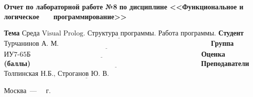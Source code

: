 \documentclass[12pt]{report}
\begin{document}
\begin{titlepage}
		\begin{center}
			\noindent\begin{minipage}{1.1\textwidth}\centering
				\Large\textbf{Отчет по лабораторной работе №8}\newline
				\textbf{по дисциплине <<Функциональное и логическое}\newline
				\textbf{~~~программирование>>}\newline\newline
			\end{minipage}
		\end{center}
		
		\noindent\textbf{Тема} $\underline{\text{Среда Visual Prolog. Структура программы. Работа программы.}}$\newline\newline
		\noindent\textbf{Студент} $\underline{\text{Турчанинов А. М.~~~~~~~~~~~~~~~~~~~~~~~~~~~~~~~~~~~~~~~~~~~~~~~~~~~~~~~~~~~~~~~~~}}$\newline\newline
		\noindent\textbf{Группа} $\underline{\text{ИУ7-65Б~~~~~~~~~~~~~~~~~~~~~~~~~~~~~~~~~~~~~~~~~~~~~~~~~~~~~~~~~~~~~~~~~~~~~~~~~}}$\newline\newline
		\noindent\textbf{Оценка (баллы)} $\underline{\text{~~~~~~~~~~~~~~~~~~~~~~~~~~~~~~~~~~~~~~~~~~~~~~~~~~~~~~~~~~~~~~~~~~~~~~~~}}$\newline\newline
		\noindent\textbf{Преподаватели} $\underline{\text{Толпинская Н.Б., Строганов Ю. В.~~~~~~~~~~~~~~~~~~~~~~~~~~}}$\newline\newline\newline
		
		\begin{center}
			\vfill
			Москва~---~\the\year
			~г.
		\end{center}
	\end{titlepage}
\end{document}
